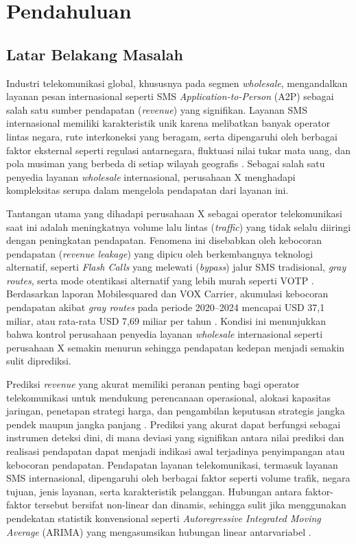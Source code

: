 \chapter{Pendahuluan}\label{ch:introduction}
    
    \section{Latar Belakang Masalah}\label{sec:background}

    Industri telekomunikasi global, khususnya pada segmen \textit{wholesale}, mengandalkan layanan pesan internasional seperti SMS \textit{Application-to-Person} (A2P) sebagai salah satu sumber pendapatan (\textit{revenue}) yang signifikan. Layanan SMS internasional memiliki karakteristik unik karena melibatkan banyak operator lintas negara, rute interkoneksi yang beragam, serta dipengaruhi oleh berbagai faktor eksternal seperti regulasi antarnegara, fluktuasi nilai tukar mata uang, dan pola musiman yang berbeda di setiap wilayah geografis \cite{10.1145/3690771.3690784}. Sebagai salah satu penyedia layanan \textit{wholesale} internasional, perusahaan X menghadapi kompleksitas serupa dalam mengelola pendapatan dari layanan ini.

    Tantangan utama yang dihadapi perusahaan X sebagai operator telekomunikasi saat ini adalah meningkatnya volume lalu lintas (\textit{traffic}) yang tidak selalu diiringi dengan peningkatan pendapatan. Fenomena ini disebabkan oleh kebocoran pendapatan (\textit{revenue leakage}) yang dipicu oleh berkembangnya teknologi alternatif, seperti \textit{Flash Calls} yang melewati (\textit{bypass}) jalur SMS tradisional, \textit{gray routes}, serta mode otentikasi alternatif yang lebih murah seperti VOTP \cite{telin2026leakage}. Berdasarkan laporan Mobilesquared dan VOX Carrier, akumulasi kebocoran pendapatan akibat \textit{gray routes} pada periode 2020--2024 mencapai USD 37,1 miliar, atau rata-rata USD 7,69 miliar per tahun \cite{mobilesquared2021}. Kondisi ini menunjukkan bahwa kontrol perusahaan penyedia layanan \textit{wholesale} internasional seperti perusahaan X semakin menurun sehingga pendapatan kedepan menjadi semakin sulit diprediksi.
    
    Prediksi \textit{revenue} yang akurat memiliki peranan penting bagi operator telekomunikasi untuk mendukung perencanaan operasional, alokasi kapasitas jaringan, penetapan strategi harga, dan pengambilan keputusan strategis jangka pendek maupun jangka panjang \cite{DiFrancescomarino2018GAHyperparameter}. Prediksi yang akurat dapat berfungsi sebagai instrumen deteksi dini, di mana deviasi yang signifikan antara nilai prediksi dan realisasi pendapatan dapat menjadi indikasi awal terjadinya penyimpangan atau kebocoran pendapatan. Pendapatan layanan telekomunikasi, termasuk layanan SMS internasional, dipengaruhi oleh berbagai faktor seperti volume trafik, negara tujuan, jenis layanan, serta karakteristik pelanggan. Hubungan antara  faktor-faktor tersebut bersifat non-linear dan dinamis, sehingga sulit jika menggunakan pendekatan statistik konvensional seperti \textit{Autoregressive Integrated Moving Average} (ARIMA) yang mengasumsikan hubungan linear antarvariabel \cite{ZHANG2003159}.
    
